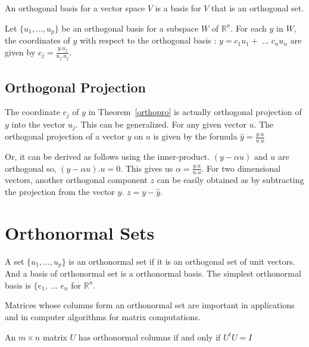 \documentclass[aima104_lecturenotes_ku.tex]{subfiles}
\begin{document}
\begin{definition}
  An orthogonal basis for a vector space $V$ is a basis for $V$ that is an orthogonal set.
\end{definition}

\begin{theorem}
  \label{orthopro}
  Let $\{u_1, ..., u_p\}$ be an orthogonal basis for a subspace $W$ of $\mathbb{R}^n$. For each $y$ in $W$, the coordinates of $y$ with respect to the orthogonal basis : $y = c_1u_1 + \; ... \; c_n u_n$ are given by $\displaystyle c_j = \frac{y.u_j}{u_j.u_j}$.
\end{theorem}

\subsection{Orthogonal Projection}
The coordinate $c_j$ of $y$ in Theorem~\ref{orthopro} is actually orthogonal projection of $y$ into the vector $u_j$. This can be generalized. For any given vector $u$. The orthogonal projection of a vector $y$ on $u$ is given by the formula $\displaystyle \hat{y} = \frac{y.u}{u.u}$

Or, it can be derived as follows using the inner-product. $(y-\alpha u)$ and $u$ are orthogonal so, $(y-\alpha u).u=0$. This gives us $\displaystyle \alpha = \frac{y.u}{u.u}$. For two dimensional vectors, another orthogonal component $z$ can be easily obtained as by subtracting the projection from the vector $y$. $z = y - \hat{y}$.

\section{Orthonormal Sets}
A set $\{u_1, ..., u_p\}$ is an orthonormal set if it is an orthogonal set of unit vectors. And a basis of orthonormal set is a orthonormal basis. The simplest orthonormal basis is $\{e_1, \; ...\; e_n$ for $\mathbb{R}^n$.

Matrices whose columns form an orthonormal set are important in applications and in computer algorithms for matrix computations.

\begin{theorem}
  An $m \times n$ matrix $U$ has orthonormal columns if and only if $U^tU=I$
\end{theorem}
\end{document}
